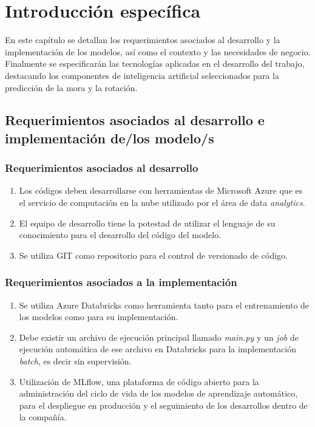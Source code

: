 \chapter{Introducción específica} %

\label{Chapter2}

En este capítulo se detallan los requerimientos asociados al desarrollo y la implementación de los modelos, así como el contexto y las necesidades de negocio. Finalmente se especificarán las tecnologías aplicadas en el desarrollo del trabajo,
destacando los componentes de inteligencia artificial seleccionados para la predicción de la mora y la rotación. 

\section{Requerimientos asociados al desarrollo e implementación de/los modelo/s}
\label{sec:ejemplo}

\subsection{Requerimientos asociados al desarrollo}

\begin{enumerate}

\item Los códigos deben desarrollarse con herramientas de Microsoft Azure que es el servicio de computación en la nube utilizado por el área de data \textit{analytics}.
\item El equipo de desarrollo tiene la potestad de utilizar el lenguaje de su conocimiento para el desarrollo del código del modelo.
\item Se utiliza GIT como repositorio para el control de versionado de código.


\end{enumerate}


\subsection{Requerimientos asociados a la implementación}
\label{subsec:ejemplo}

\begin{enumerate}
\item Se utiliza Azure Databricks como herramienta tanto para el entrenamiento de los modelos como para su implementación.
\item Debe existir un archivo de ejecución principal llamado \textit{main.py} y un \textit{job} de ejecución automática de ese archivo en Databricks para la implementación \textit{batch}, es decir sin supervisión.
\item Utilización de MLflow, una plataforma de código abierto para la administración del ciclo de vida de los modelos de aprendizaje automático, para el despliegue en producción y el seguimiento de los desarrollos dentro de la compañía.
\end{enumerate}


